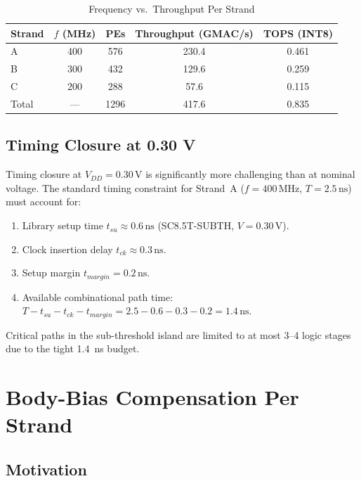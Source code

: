\begin{table}[htbp]
\centering
\caption{Frequency vs.\ Throughput Per Strand}
\label{tab:freq_throughput}
\begin{tabular}{lcccc}
\hline
Strand & $f$ (MHz) & PEs & Throughput (GMAC/s) & TOPS (INT8) \\
\hline
A & 400 & 576 & 230.4 & 0.461 \\
B & 300 & 432 & 129.6 & 0.259 \\
C & 200 & 288 &  57.6 & 0.115 \\
\hline
Total & --- & 1296 & 417.6 & 0.835 \\
\hline
\end{tabular}
\end{table}

\subsection{Timing Closure at 0.30 V}

Timing closure at $V_{DD} = 0.30\,\text{V}$ is significantly more challenging than at nominal
voltage.  The standard timing constraint for Strand~A ($f = 400\,\text{MHz}$, $T =
2.5\,\text{ns}$) must account for:
\begin{enumerate}
  \item Library setup time $t_{su} \approx 0.6\,\text{ns}$ (SC8.5T-SUBTH, $V = 0.30\,\text{V}$).
  \item Clock insertion delay $t_{ck} \approx 0.3\,\text{ns}$.
  \item Setup margin $t_{margin} = 0.2\,\text{ns}$.
  \item Available combinational path time: $T - t_{su} - t_{ck} - t_{margin} = 2.5 - 0.6 - 0.3 - 0.2 = 1.4\,\text{ns}$.
\end{enumerate}
Critical paths in the sub-threshold island are limited to at most 3--4 logic stages due to
the tight 1.4~ns budget.

\section{Body-Bias Compensation Per Strand}
\label{sec:body_bias_compensation}

\subsection{Motivation}

